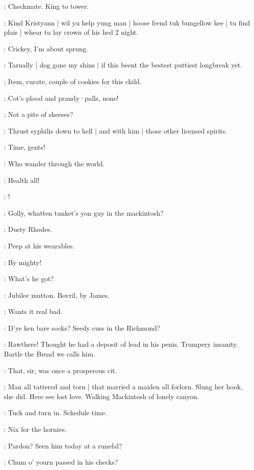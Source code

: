 \stephen:
Checkmate.
King to tower.

\stephen:
Kind Kristyann |
wil yu help yung man |
hoose frend tuk bungellow kee |
tu find plais |
whear tu lay crown of his hed 2 night.

\lynch:
Crickey,
I'm about sprung.

\lenehan:
Tarnally |
dog gone my shins |
if this beent the bestest puttiest longbreak yet.

\punch:
Item,
curate,
couple of cookies for this child.

\dixon:
Cot's plood and prandy·palls,
none!

\lynch:
Not a pite of sheeses?

\stephen:
Thrust syphilis down to hell |
and with him |
those other licensed spirits.

\barman:
Time,
gents!

\stephen:
Who wander through the world.

\punch:
Health all!

\dixon:
!


\crotthers:
Golly,
whatten tunket's yon guy in the mackintosh?

\lenehan:
Dusty Rhodes.

\lynch:
Peep at his wearables.

\crotthers:
By mighty!

\stephen:
What's he got?

\dixon:
Jubilee mutton.
Bovril,
by James.

\lenehan:
Wants it real bad.

\crotthers:
D'ye ken bare socks?
Seedy cuss in the Richmond?

\dixon:
Rawthere!
Thought he had a deposit of lead in his penis.
Trumpery insanity.
Bartle the Bread we calls him.

\lynch:
That,
sir,
was once a prosperous cit.

\Bloom:
Man all tattered and torn |
that married a maiden all forlorn.
Slung her hook,
she did.
Here see lost love.
Walking Mackintosh of lonely canyon.

\stephen:
Tuck and turn in.
Schedule time.

\lenehan:
Nix for the hornies.

\Bloom:
Pardon?
Seen him today at a runefal?

\lenehan:
Chum o' yourn passed in his checks?

